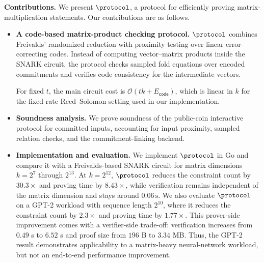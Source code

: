 \noindent\textbf{Contributions.}
We present \(\protocol\), a protocol for efficiently proving
matrix-multiplication statements.  Our contributions are as follows.
\begin{itemize}
  \item \textbf{A code-based matrix-product checking protocol.}
  \(\protocol\) combines Freivalds' randomized reduction with proximity testing
  over linear error-correcting codes.  Instead of computing vector--matrix
  products inside the SNARK circuit, the protocol checks sampled fold equations
  over encoded commitments and verifies code consistency for the intermediate
  vectors. 

  For fixed \(t\), the main circuit cost is
  \(\mathcal{O}(tk+E_{\mathsf{code}})\), which is linear in \(k\) for the
  fixed-rate Reed--Solomon setting used in our implementation.

  \item \textbf{Soundness analysis.}
  We prove soundness of the public-coin interactive protocol for committed
  inputs, accounting for input proximity, sampled relation checks, and the
  commitment-linking backend.

  \item \textbf{Implementation and evaluation.}
  We implement \(\protocol\) in Go and compare it with a Freivalds-based SNARK
  circuit for matrix dimensions \(k=2^7\) through \(2^{13}\).  At
\(k=2^{12}\), \(\protocol\) reduces the constraint count by \(30.3\times\)
and proving time by \(8.43\times\), while verification remains independent of
the matrix dimension and stays around \(0.06\,\text{s}\).  We also evaluate
  \(\protocol\) on a GPT-2 workload with sequence length \(2^{10}\), where it
  reduces the constraint count by \(2.3\times\) and proving time by
  \(1.77\times\).  This prover-side improvement comes with a verifier-side
  trade-off: verification increases from \(0.49\) s to \(6.52\) s and proof
  size from \(196\) B to \(3.34\) MB.  Thus, the GPT-2 result demonstrates
  applicability to a matrix-heavy neural-network workload, but not an
  end-to-end performance improvement.
\end{itemize}

